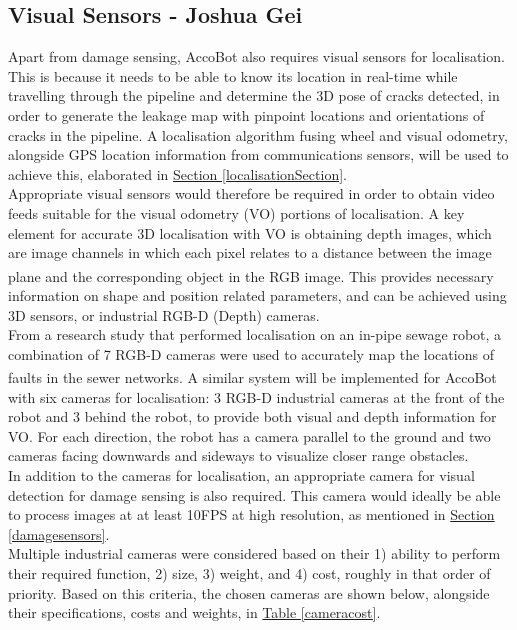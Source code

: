 \documentclass[11pt]{article}		%
\newcommand{\supercite}[1]{\textsuperscript{\cite{#1}}}		%
\newcommand{\tableref}[1]{\hyperref[#1]{Table \ref*{#1}}}     %
\newcommand{\sectref}[1]{\hyperref[#1]{Section \ref*{#1}}}     %
\begin{document}
		\subsection[Visual Sensors]{Visual Sensors - Joshua Gei}
        \label{visualSensors}
	        Apart from damage sensing, AccoBot also requires visual sensors for localisation. This is because it needs to be able to know its location in real-time while travelling through the pipeline and determine the 3D pose of cracks detected, in order to generate the leakage map with pinpoint locations and orientations of cracks in the pipeline. A localisation algorithm fusing wheel and visual odometry, alongside GPS location information from communications sensors, will be used to achieve this, elaborated in \sectref{localisationSection}.
            \\
            \hspace*{2ex}Appropriate visual sensors would therefore be required in order to obtain video feeds suitable for the visual odometry (VO) portions of localisation. A key element for accurate 3D localisation with VO is obtaining depth images, which are image channels in which each pixel relates to a distance between the image plane and the corresponding object in the RGB image\supercite{visualodometry}. This provides necessary information on shape and position related parameters, and can be achieved using 3D sensors, or industrial RGB-D (Depth) cameras.
            \\
            \hspace*{2ex}From a research study that performed localisation on an in-pipe sewage robot, a combination of 7 RGB-D cameras were used to accurately map the locations of faults in the sewer networks\supercite{sewerpaper}. A similar system will be implemented for AccoBot with six cameras for localisation: 3 RGB-D industrial cameras at the front of the robot and 3 behind the robot, to provide both visual and depth information for VO. For each direction, the robot has a camera parallel to the ground and two cameras facing downwards and sideways to visualize closer range obstacles. 
	        \\\hspace*{2ex}In addition to the cameras for localisation, an appropriate camera for visual detection for damage sensing is also required. This camera would ideally be able to process images at at least 10FPS at high resolution, as mentioned in \sectref{damagesensors}.
            \\ \hspace*{2ex} Multiple industrial cameras were considered based on their 1) ability to perform their required function, 2) size, 3) weight, and 4) cost, roughly in that order of priority. Based on this criteria, the chosen cameras are shown below, alongside their specifications, costs and weights, in \tableref{cameracost}. 
            
\end{document}
